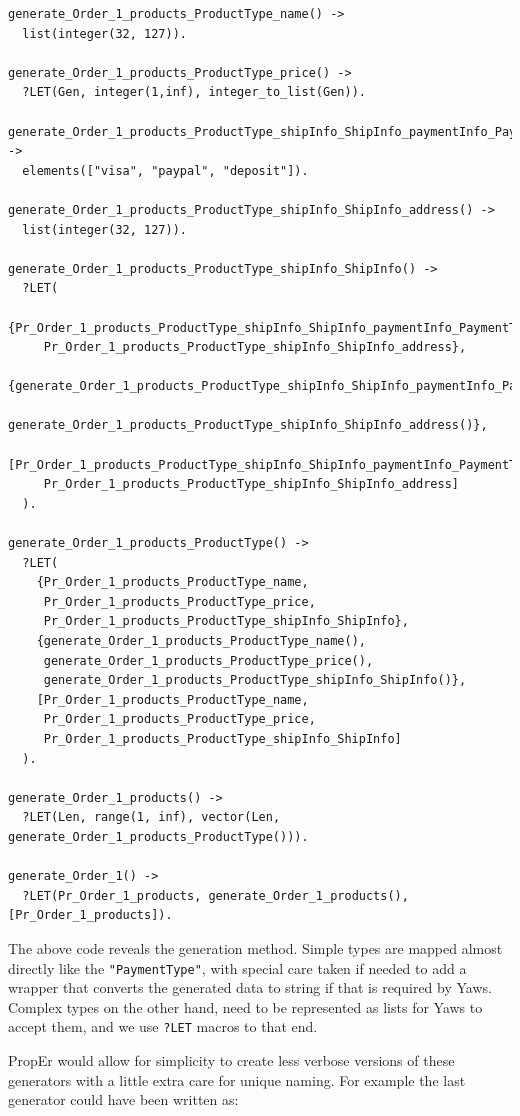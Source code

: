 \documentclass[submission,copyright]{eptcs}
\newcommand{\LET}{\texttt{?LET}\xspace}
\begin{document}
\begin{lstlisting}
generate_Order_1_products_ProductType_name() -> 
  list(integer(32, 127)).

generate_Order_1_products_ProductType_price() ->  
  ?LET(Gen, integer(1,inf), integer_to_list(Gen)).

generate_Order_1_products_ProductType_shipInfo_ShipInfo_paymentInfo_PaymentType() -> 
  elements(["visa", "paypal", "deposit"]).

generate_Order_1_products_ProductType_shipInfo_ShipInfo_address() -> 
  list(integer(32, 127)).

generate_Order_1_products_ProductType_shipInfo_ShipInfo() -> 
  ?LET(
    {Pr_Order_1_products_ProductType_shipInfo_ShipInfo_paymentInfo_PaymentType,
     Pr_Order_1_products_ProductType_shipInfo_ShipInfo_address},
    {generate_Order_1_products_ProductType_shipInfo_ShipInfo_paymentInfo_PaymentType(),
     generate_Order_1_products_ProductType_shipInfo_ShipInfo_address()},
    [Pr_Order_1_products_ProductType_shipInfo_ShipInfo_paymentInfo_PaymentType,
     Pr_Order_1_products_ProductType_shipInfo_ShipInfo_address]
  ).

generate_Order_1_products_ProductType() -> 
  ?LET(
    {Pr_Order_1_products_ProductType_name, 
     Pr_Order_1_products_ProductType_price, 
     Pr_Order_1_products_ProductType_shipInfo_ShipInfo},
    {generate_Order_1_products_ProductType_name(), 
     generate_Order_1_products_ProductType_price(), 
     generate_Order_1_products_ProductType_shipInfo_ShipInfo()},
    [Pr_Order_1_products_ProductType_name, 
     Pr_Order_1_products_ProductType_price, 
     Pr_Order_1_products_ProductType_shipInfo_ShipInfo] 
  ).

generate_Order_1_products() -> 
  ?LET(Len, range(1, inf), vector(Len, generate_Order_1_products_ProductType())).

generate_Order_1() -> 
  ?LET(Pr_Order_1_products, generate_Order_1_products(), [Pr_Order_1_products]).
\end{lstlisting}

The above code reveals the generation method. Simple types are mapped almost directly 
like the \texttt{"PaymentType"}, with special care taken if needed to add a wrapper that converts 
the generated data to string if that is required by Yaws. Complex types on the other hand, 
need to be represented as lists for Yaws to accept them, and we use \LET macros to that end. 

PropEr would allow for simplicity to create less verbose versions of these generators 
with a little extra care for unique naming. For example the last generator could have 
been written as:
\end{document}
